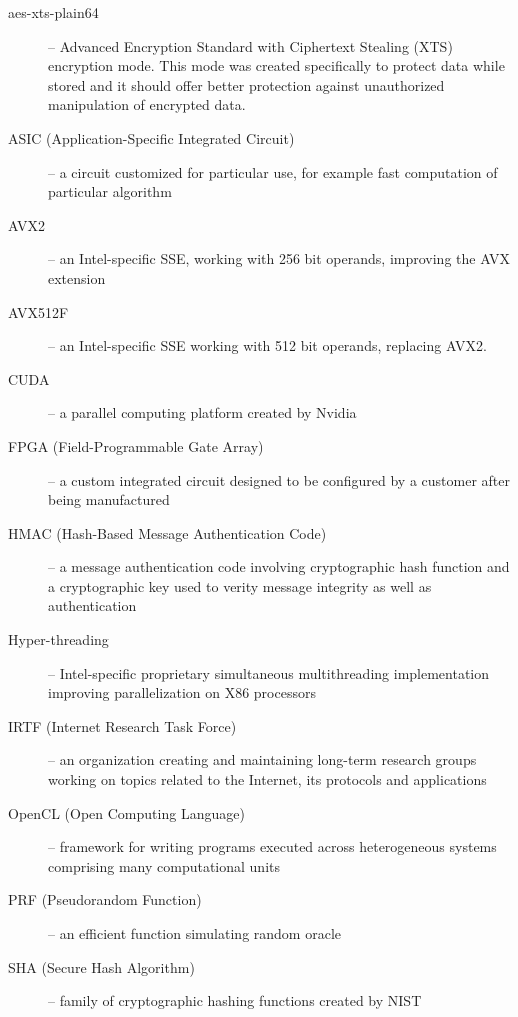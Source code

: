 \documentclass[nolof,digital]{fithesis3}
\begin{document}
\begin{description}
\item[aes-xts-plain64] -- Advanced Encryption Standard with Ciphertext Stealing (XTS) encryption mode. This mode was created specifically to protect data while stored and it should offer better protection against unauthorized manipulation of encrypted data.

\item[ASIC (Application-Specific Integrated Circuit)] -- a circuit customized for particular use, for example fast computation of particular algorithm

\item[AVX2] -- an Intel-specific SSE, working with 256 bit operands, improving the AVX extension

\item[AVX512F] -- an Intel-specific SSE working with 512 bit operands, replacing AVX2. 

\item[CUDA] -- a parallel computing platform created by Nvidia

\item[FPGA (Field-Programmable Gate Array)] -- a custom integrated circuit designed to be configured by a customer after being manufactured

\item[HMAC (Hash-Based Message Authentication Code)] -- a message authentication code involving cryptographic hash function and a cryptographic key used to verity message integrity as well as authentication

\item[Hyper-threading] -- Intel-specific proprietary simultaneous multithreading implementation improving parallelization on X86 processors

\item[IRTF (Internet Research Task Force)] -- an organization creating and maintaining long-term research groups working on topics related to the Internet, its protocols and applications

\item[OpenCL (Open Computing Language)] -- framework for writing programs executed across heterogeneous systems comprising many computational units

\item[PRF (Pseudorandom Function)] -- an efficient function simulating random oracle

\item[SHA (Secure Hash Algorithm)] -- family of cryptographic hashing functions created by NIST


\end{description}
\end{document}
